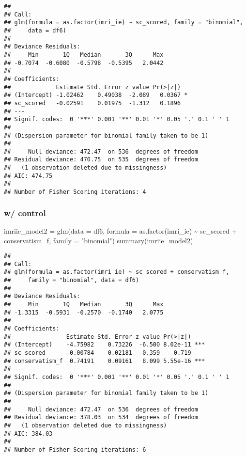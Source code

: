 \documentclass[
]{article}
\newenvironment{Shaded}{\begin{snugshade}}{\end{snugshade}}
\newcommand{\AttributeTok}[1]{\textcolor[rgb]{0.77,0.63,0.00}{#1}}
\newcommand{\FunctionTok}[1]{\textcolor[rgb]{0.00,0.00,0.00}{#1}}
\newcommand{\NormalTok}[1]{#1}
\newcommand{\OtherTok}[1]{\textcolor[rgb]{0.56,0.35,0.01}{#1}}
\newcommand{\SpecialCharTok}[1]{\textcolor[rgb]{0.00,0.00,0.00}{#1}}
\newcommand{\StringTok}[1]{\textcolor[rgb]{0.31,0.60,0.02}{#1}}
\begin{document}
\begin{verbatim}
## 
## Call:
## glm(formula = as.factor(imri_ie) ~ sc_scored, family = "binomial", 
##     data = df6)
## 
## Deviance Residuals: 
##     Min       1Q   Median       3Q      Max  
## -0.7074  -0.6080  -0.5798  -0.5395   2.0442  
## 
## Coefficients:
##             Estimate Std. Error z value Pr(>|z|)  
## (Intercept) -1.02462    0.49038  -2.089   0.0367 *
## sc_scored   -0.02591    0.01975  -1.312   0.1896  
## ---
## Signif. codes:  0 '***' 0.001 '**' 0.01 '*' 0.05 '.' 0.1 ' ' 1
## 
## (Dispersion parameter for binomial family taken to be 1)
## 
##     Null deviance: 472.47  on 536  degrees of freedom
## Residual deviance: 470.75  on 535  degrees of freedom
##   (1 observation deleted due to missingness)
## AIC: 474.75
## 
## Number of Fisher Scoring iterations: 4
\end{verbatim}

\hypertarget{w-control-1}{%
\subsubsection{w/ control}\label{w-control-1}}

\begin{Shaded}
\begin{Highlighting}[]
\NormalTok{imriie\_model2 }\OtherTok{=} \FunctionTok{glm}\NormalTok{(}\AttributeTok{data =}\NormalTok{ df6, }\AttributeTok{formula =} \FunctionTok{as.factor}\NormalTok{(imri\_ie) }\SpecialCharTok{\textasciitilde{}}\NormalTok{ sc\_scored }\SpecialCharTok{+}\NormalTok{ conservatism\_f, }\AttributeTok{family =} \StringTok{"binomial"}\NormalTok{)}
\FunctionTok{summary}\NormalTok{(imriie\_model2)}
\end{Highlighting}
\end{Shaded}

\begin{verbatim}
## 
## Call:
## glm(formula = as.factor(imri_ie) ~ sc_scored + conservatism_f, 
##     family = "binomial", data = df6)
## 
## Deviance Residuals: 
##     Min       1Q   Median       3Q      Max  
## -1.3315  -0.5931  -0.2570  -0.1740   2.0775  
## 
## Coefficients:
##                Estimate Std. Error z value Pr(>|z|)    
## (Intercept)    -4.75982    0.73226  -6.500 8.02e-11 ***
## sc_scored      -0.00784    0.02181  -0.359    0.719    
## conservatism_f  0.74191    0.09161   8.099 5.55e-16 ***
## ---
## Signif. codes:  0 '***' 0.001 '**' 0.01 '*' 0.05 '.' 0.1 ' ' 1
## 
## (Dispersion parameter for binomial family taken to be 1)
## 
##     Null deviance: 472.47  on 536  degrees of freedom
## Residual deviance: 378.03  on 534  degrees of freedom
##   (1 observation deleted due to missingness)
## AIC: 384.03
## 
## Number of Fisher Scoring iterations: 6
\end{verbatim}
\end{document}
